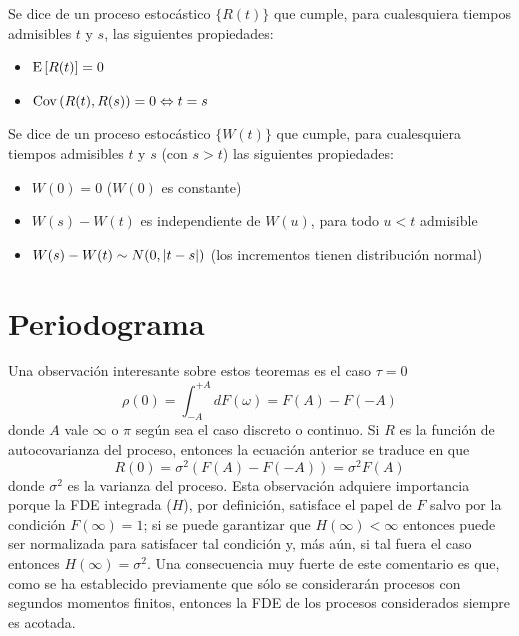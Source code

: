 \begin{definicion}
Se dice de un proceso estoc\'astico $\{ R(t) \}$ que cumple, para cualesquiera tiempos admisibles
$t$ y $s$, las siguientes propiedades:
\begin{itemize}
\item $\mathrm{E}\left[ R(t) \right]=0$
\item $\mathrm{Cov}\left( R(t),R(s) \right)=0 \Leftrightarrow t=s$ 
\end{itemize}
\label{r_blanco}
\end{definicion}

\begin{definicion}
Se dice de un proceso estoc\'astico $\{ W(t) \}$ que cumple, para cualesquiera tiempos admisibles
$t$ y $s$ (con $s>t$) las siguientes propiedades:
\begin{itemize}
\item $W(0) = 0$ ($W(0)$ es constante)
\item $W(s)-W(t)$ es independiente de $W(u)$, para todo $u<t$ admisible
\item $W(s)-W(t) \sim N(0,\left| t-s \right|)$  (los incrementos tienen distribuci\'on normal)
\end{itemize}
\label{r_wiener}
\end{definicion}


\section{Periodograma}

Una observaci\'on interesante sobre estos teoremas es el caso $\tau = 0$
\begin{equation*}
\rho(0) = \int_{-A}^{+A} dF(\omega) = F(A) - F(-A)
\end{equation*}
donde $A$ vale $\infty$ o $\pi$ seg\'un sea el caso discreto o continuo. Si $R$ es la funci\'on de
autocovarianza del proceso, entonces la ecuaci\'on anterior se traduce en que
\begin{equation*}
R(0) = \sigma^{2} \left( F(A) - F(-A) \right) = \sigma^{2} F(A)
\end{equation*}
donde $\sigma^{2}$ es la varianza del proceso. 
Esta observaci\'on adquiere importancia porque la FDE integrada ($H$), por definici\'on, satisface 
el papel de $F$ salvo por la condici\'on $F(\infty)=1$; si se puede garantizar que 
$H(\infty)<\infty$ entonces puede ser normalizada para satisfacer tal condici\'on y, m\'as a\'un,
si tal fuera el caso entonces $H(\infty)=\sigma^{2}$. Una consecuencia muy fuerte de este 
comentario es que, como se ha establecido previamente que s\'olo se considerar\'an procesos con
segundos momentos finitos, entonces la FDE de los procesos considerados siempre es acotada.


